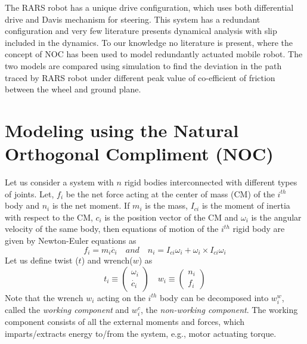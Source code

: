  The RARS robot has a unique  drive configuration, which uses both differential drive and Davis mechanism for steering. 
 This system has a redundant configuration and very few literature presents dynamical analysis with slip included in the dynamics. To our knowledge no literature is present, where the concept of  NOC  has been used to model redundantly actuated mobile robot. The two models are compared using simulation to find the deviation in the path traced by RARS robot under different peak value of co-efficient of friction between the wheel and ground plane.
   


   
 
 

  
  
  
  
  
\section{Modeling using the Natural Orthogonal Compliment (NOC)}
Let us consider a system with $n$ rigid bodies interconnected with different types of joints. 
Let, $f_i$ be the net force acting at the center of mass (CM) of the $i^{th}$  body and $n_i$ is the net moment.
 If $m_i$ is the mass, $I_{ci}$ is the  moment of inertia with respect to the CM, $c_i$ is the position vector of the CM and $\omega_i$ is the angular velocity of the same body, then equations of motion of the $i^{th}$ rigid body are given by Newton-Euler equations as 
\begin{equation}
\label{NE}
f_i=m_i\ddot{c_i} \quad and \quad n_i=I_{ci} \omega_i+\omega_i \times I_{ci} \omega_i
\end{equation}
Let us  define twist ($t$) and wrench($w$) as 
\begin{equation*}
t_i \equiv \begin{pmatrix}
\omega_i\\ \dot{c_i}
\end{pmatrix} \quad
w_i \equiv \begin{pmatrix}
n_i\\f_i
\end{pmatrix}
\end{equation*}
Note that the wrench $w_i$ acting on the $i^{th}$ body can be decomposed into $w^w_i$, called the \textit{working component} and  $w^c_i$, the \textit{non-working component}.
 The working component consists of all the external  moments and forces, which imparts/extracts energy to/from the system, e.g., motor actuating torque.
